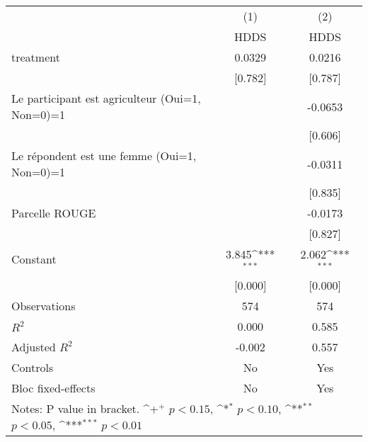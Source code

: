 {
\def\sym#1{\ifmmode^{#1}\else\(^{#1}\)\fi}
\begin{tabular*}{1.2\hsize}{@{\hskip\tabcolsep\extracolsep\fill}l*{2}{c}}
\cline{2-3}\cline{2-3}
     &\multicolumn{1}{c}{(1)}&\multicolumn{1}{c}{(2)}\\
     &\multicolumn{1}{c}{HDDS}&\multicolumn{1}{c}{HDDS}\\
\cline{2-3}
treatment&0.0329         &0.0216         \\
     &[0.782]         &[0.787]         \\
[1em]
Le participant est agriculteur (Oui=1, Non=0)=1&           &-0.0653         \\
     &           &[0.606]         \\
[1em]
Le répondent est une femme (Oui=1, Non=0)=1&           &-0.0311         \\
     &           &[0.835]         \\
[1em]
Parcelle ROUGE&           &-0.0173         \\
     &           &[0.827]         \\
[1em]
Constant&3.845\sym{***}&2.062\sym{***}\\
     &[0.000]         &[0.000]         \\
\cline{2-3}
Observations&574         &574         \\
\(R^{2}\)&0.000         &0.585         \\
Adjusted \(R^{2}\)&-0.002         &0.557         \\
Controls&No         &Yes         \\
Bloc fixed-effects&No         &Yes         \\
\cline{2-3}\cline{2-3}
\multicolumn{3}{p{1.0\textwidth}}{\footnotesize Notes: P value in bracket. \sym{+} \(p<0.15\), \sym{*} \(p<0.10\), \sym{**} \(p<0.05\), \sym{***} \(p<0.01\)}\\
\end{tabular*}
}
